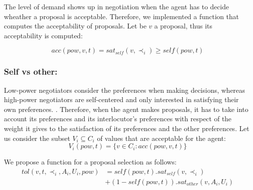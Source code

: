 \documentclass[runningheads,a4paper]{llncs}
\begin{document}
	
	
	The level of demand shows up in negotiation when the agent has to decide wheather a proposal is acceptable.
	Therefore, we implemented a function that computes the acceptability of proposals. Let be $v$ a proposal, thus its acceptability is computed:
	
	\begin{equation}
	acc(pow,v, t) = sat_{self}(v, \prec_i) \geq   self(pow,t)
	\end{equation}
	
	
	\subsubsection{Self vs other:} Low-power negotiators consider the preferences when making decisions, whereas high-power negotiators are self-centered and only interested in satisfying their own preferences. \cite{fiske1993controlling,de1995impact}.
	Therefore, when the agent makes proposals, it has to take into account its preferences and its interlocutor's preferences with respect of the weight it gives to the satisfaction of its preferences and the other preferences.	
	Let us consider the subset $V_i\subseteq C_i$ of values that are acceptable for the agent:
	\begin{equation}
	V_i(pow,t) = \{ v\in C_i : acc(pow,v,t) \}
	\end{equation}
	
	We propose a function for a proposal selection as follows:
	\begin{equation}
	\begin{split}
	tol(v, t, \prec_i, A_i, U_i, pow) & = self(pow, t) . sat_{self}(v, \prec_i) \\
	& +  (1 - self(pow, t)) . sat_{other}(v, A_i, U_i)
	\end{split}
	\end{equation}
	
\end{document}
